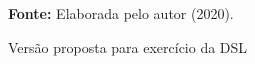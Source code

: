 \begin{figure}[ht!]
\centering

\caption{\textmd{Versão proposta para exercício da DSL}}
\label{fig:exercicio}

\par\medskip\textbf{Fonte:} Elaborada pelo autor (2020). \par\medskip

\end{figure}

